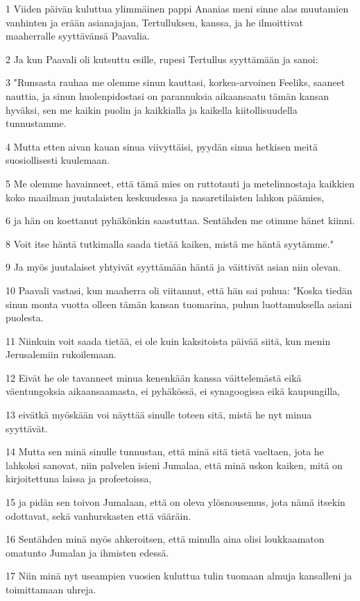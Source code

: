 \par 1 Viiden päivän kuluttua ylimmäinen pappi Ananias meni sinne alas muutamien vanhinten ja erään asianajajan, Tertulluksen, kanssa, ja he ilmoittivat maaherralle syyttävänsä Paavalia.
\par 2 Ja kun Paavali oli kutsuttu esille, rupesi Tertullus syyttämään ja sanoi:
\par 3 "Runsasta rauhaa me olemme sinun kauttasi, korkea-arvoinen Feeliks, saaneet nauttia, ja sinun huolenpidostasi on parannuksia aikaansaatu tämän kansan hyväksi, sen me kaikin puolin ja kaikkialla ja kaikella kiitollisuudella tunnustamme.
\par 4 Mutta etten aivan kauan sinua viivyttäisi, pyydän sinua hetkisen meitä suosiollisesti kuulemaan.
\par 5 Me olemme havainneet, että tämä mies on ruttotauti ja metelinnostaja kaikkien koko maailman juutalaisten keskuudessa ja nasaretilaisten lahkon päämies,
\par 6 ja hän on koettanut pyhäkönkin saastuttaa. Sentähden me otimme hänet kiinni.
\par 8 Voit itse häntä tutkimalla saada tietää kaiken, mistä me häntä syytämme."
\par 9 Ja myös juutalaiset yhtyivät syyttämään häntä ja väittivät asian niin olevan.
\par 10 Paavali vastasi, kun maaherra oli viitannut, että hän sai puhua: "Koska tiedän sinun monta vuotta olleen tämän kansan tuomarina, puhun luottamuksella asiani puolesta.
\par 11 Niinkuin voit saada tietää, ei ole kuin kaksitoista päivää siitä, kun menin Jerusalemiin rukoilemaan.
\par 12 Eivät he ole tavanneet minua kenenkään kanssa väittelemästä eikä väentungoksia aikaansaamasta, ei pyhäkössä, ei synagoogissa eikä kaupungilla,
\par 13 eivätkä myöskään voi näyttää sinulle toteen sitä, mistä he nyt minua syyttävät.
\par 14 Mutta sen minä sinulle tunnustan, että minä sitä tietä vaeltaen, jota he lahkoksi sanovat, niin palvelen isieni Jumalaa, että minä uskon kaiken, mitä on kirjoitettuna laissa ja profeetoissa,
\par 15 ja pidän sen toivon Jumalaan, että on oleva ylösnousemus, jota nämä itsekin odottavat, sekä vanhurskasten että vääräin.
\par 16 Sentähden minä myös ahkeroitsen, että minulla aina olisi loukkaamaton omatunto Jumalan ja ihmisten edessä.
\par 17 Niin minä nyt useampien vuosien kuluttua tulin tuomaan almuja kansalleni ja toimittamaan uhreja.
